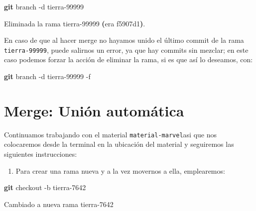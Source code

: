 \documentclass[
]{book}
\newenvironment{Shaded}{\begin{snugshade}}{\end{snugshade}}
\newcommand{\AttributeTok}[1]{\textcolor[rgb]{0.13,0.29,0.53}{#1}}
\newcommand{\BuiltInTok}[1]{#1}
\newcommand{\ErrorTok}[1]{\textcolor[rgb]{0.64,0.00,0.00}{\textbf{#1}}}
\newcommand{\ExtensionTok}[1]{#1}
\newcommand{\FunctionTok}[1]{\textcolor[rgb]{0.13,0.29,0.53}{\textbf{#1}}}
\newcommand{\KeywordTok}[1]{\textcolor[rgb]{0.13,0.29,0.53}{\textbf{#1}}}
\newcommand{\NormalTok}[1]{#1}
\newcommand{\StringTok}[1]{\textcolor[rgb]{0.31,0.60,0.02}{#1}}
\providecommand{\tightlist}{%
  \setlength{\itemsep}{0pt}\setlength{\parskip}{0pt}}
\begin{document}
\begin{Shaded}
\begin{Highlighting}[]
\FunctionTok{git}\NormalTok{ branch }\AttributeTok{{-}d}\NormalTok{ tierra{-}99999}
\end{Highlighting}
\end{Shaded}

\begin{Shaded}
\begin{Highlighting}[]
\ExtensionTok{Eliminada}\NormalTok{ la rama tierra{-}99999 }\ErrorTok{(}\ExtensionTok{era}\NormalTok{ f5907d1}\KeywordTok{)}\BuiltInTok{.}
\end{Highlighting}
\end{Shaded}

En caso de que al hacer merge no hayamos unido el último commit de la rama \texttt{tierra-99999}, puede salirnos un error, ya que hay commits sin mezclar; en este caso podemos forzar la acción de eliminar la rama, si es que así lo deseamos, con:

\begin{Shaded}
\begin{Highlighting}[]
\FunctionTok{git}\NormalTok{ branch }\AttributeTok{{-}d}\NormalTok{ tierra{-}99999 }\AttributeTok{{-}f}
\end{Highlighting}
\end{Shaded}

\section{Merge: Unión automática}\label{merge-uniuxf3n-automuxe1tica}

Continuamos trabajando con el material \texttt{material-marvel}asi que nos colocaremos desde la terminal en la ubicación del material y seguiremos las siguientes instrucciones:

\begin{enumerate}
\def\labelenumi{\arabic{enumi}.}
\tightlist
\item
  Para crear una rama nueva y a la vez movernos a ella, emplearemos:
\end{enumerate}

\begin{Shaded}
\begin{Highlighting}[]
\FunctionTok{git}\NormalTok{ checkout }\AttributeTok{{-}b}\NormalTok{ tierra{-}7642}
\end{Highlighting}
\end{Shaded}

\begin{Shaded}
\begin{Highlighting}[]
\ExtensionTok{Cambiado}\NormalTok{ a nueva rama }\StringTok{\textquotesingle{}tierra{-}7642\textquotesingle{}}
\end{Highlighting}
\end{Shaded}
\end{document}
